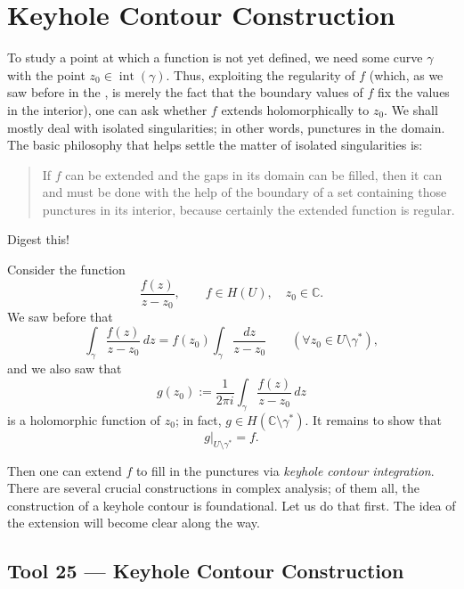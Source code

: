 \documentclass[11pt,a4paper]{article}
\begin{document}
\section*{Keyhole Contour Construction}
To study a point at which a function is not yet defined, we need some curve $\gamma$ with the point $z_0\in\operatorname{int}(\gamma)$. Thus, exploiting the regularity of $f$ (which, as we saw before in the , is merely the fact that the boundary values of $f$ fix the values in the interior), one can ask whether $f$ extends holomorphically to $z_0$. We shall mostly deal with isolated singularities; in other words, punctures in the domain. The basic philosophy that helps settle the matter of isolated singularities is:

\begin{quote}
If $f$ can be extended and the gaps in its domain can be filled, then it can and must be done with the help of the boundary of a set containing those punctures in its interior, because certainly the extended function is regular.
\end{quote}

Digest this!

Consider the function
\[
  \frac{f(z)}{z-z_0},
  \qquad f\in H(U),\quad z_0\in\mathbb C.
\]
We saw before that
\[
  \int_\gamma \frac{f(z)}{z-z_0}\,dz
  =f(z_0)\int_\gamma\frac{dz}{z-z_0}
  \qquad (\forall z_0\in U\setminus\gamma^*),
\]
and we also saw that
\[
  g(z_0):=\frac{1}{2\pi i}\int_\gamma\frac{f(z)}{z-z_0}\,dz
\]
is a holomorphic function of $z_0$; in fact, $g\in H(\mathbb C\setminus\gamma^*)$. It remains to show that
\[
  \left.g\right|_{U\setminus\gamma^*}=f.
\]


Then one can extend $f$ to fill in the punctures via \emph{keyhole contour integration}. There are several crucial constructions in complex analysis; of them all, the construction of a keyhole contour is foundational. Let us do that first. The idea of the extension will become clear along the way.

\subsection*{Tool 25 — Keyhole Contour Construction}
\end{document}
